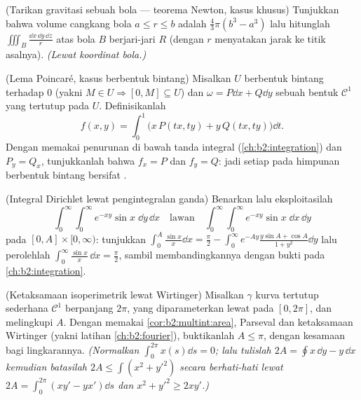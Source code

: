 \begin{exercise}[$\star\star$]\label{exo:b2:multint:7}
(Tarikan gravitasi sebuah bola --- teorema Newton, kasus
khusus) Tunjukkan bahwa volume cangkang bola $a \leq r \leq
b$ adalah $\frac43\pi(b^3 - a^3)$ lalu hitunglah $\iiint_{B}
\frac{\dd x\,\dd y\,\dd z}{r}$ atas bola $B$ berjari-jari $R$
(dengan $r$ menyatakan jarak ke titik asalnya). \emph{(Lewat koordinat
bola.)}
\end{exercise}

\begin{exercise}[$\star\star\star$]\label{exo:b2:multint:8}
(Lema Poincaré, kasus berbentuk bintang) Misalkan $U$ berbentuk bintang
terhadap $0$ (yakni $M \in U \Rightarrow [0, M] \subseteq U$)
dan $\omega = P\dd x + Q\dd y$ sebuah bentuk $\mathcal{C}^1$ yang tertutup pada
$U$. Definisikanlah
\[
f(x, y) = \int_0^1 \bigl(x\,P(tx, ty) + y\,Q(tx, ty)\bigr)\dd t .
\]
Dengan memakai penurunan di bawah tanda integral
(\cref{ch:b2:integration}) dan $P_y = Q_x$, tunjukkanlah bahwa $f_x = P$
dan $f_y = Q$: jadi setiap  pada himpunan  berbentuk bintang bersifat
.
\end{exercise}

\begin{exercise}[$\star\star\star$]\label{exo:b2:multint:9}
(Integral Dirichlet lewat pengintegralan ganda) Benarkan lalu eksploitasilah
\[
\int_0^\infty\!\!\int_0^\infty e^{-xy}\sin x\;\dd y\,\dd x
\quad\text{lawan}\quad
\int_0^\infty\!\!\int_0^\infty e^{-xy}\sin x\;\dd x\,\dd y
\]
pada $[0, A] \times [0, \infty)$: tunjukkan $\int_0^A \frac{\sin
x}{x}\dd x = \frac\pi2 - \int_0^\infty
e^{-Ay}\frac{y\sin A + \cos A}{1 + y^2}\dd y$ lalu perolehlah
$\int_0^\infty \frac{\sin x}{x}\,\dd x = \frac\pi2$, sambil membandingkannya
dengan bukti  pada
\cref{ch:b2:integration}.
\end{exercise}

\begin{exercise}[$\star\star\star$]\label{exo:b2:multint:10}
(Ketaksamaan isoperimetrik lewat Wirtinger) Misalkan $\gamma$ kurva
tertutup sederhana $\mathcal{C}^1$ berpanjang $2\pi$, yang diparameterkan lewat  pada $[0, 2\pi]$, dan melingkupi  $A$. Dengan memakai
\cref{cor:b2:multint:area}, Parseval dan ketaksamaan Wirtinger
(yakni latihan \cref{ch:b2:fourier}), buktikanlah $A \leq \pi$, dengan
kesamaan bagi lingkarannya. \emph{(Normalkan $\int_0^{2\pi} x(s)\dd s
= 0$; lalu tulislah $2A = \oint x\,\dd y - y\,\dd x$ kemudian batasilah $2A \leq
\int (x^2 + y'^2)$ secara berhati-hati lewat $2A = \int_0^{2\pi}(xy' - yx')\dd
s$ dan $x^2 + y'^2 \geq 2xy'$.)}
\end{exercise}

